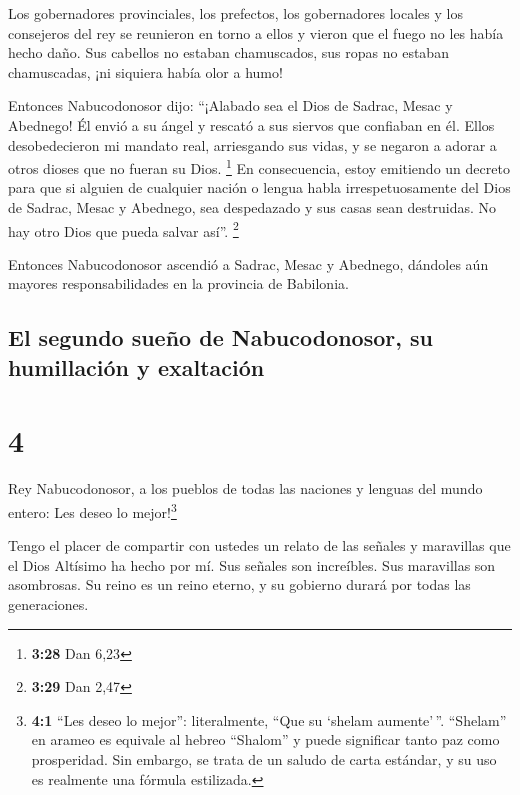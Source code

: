  Los gobernadores provinciales, los prefectos, los
gobernadores locales y los consejeros del rey se reunieron en torno a
ellos y vieron que el fuego no les había hecho daño. Sus cabellos no
estaban chamuscados, sus ropas no estaban chamuscadas, ¡ni siquiera
había olor a humo!

 Entonces Nabucodonosor dijo: ``¡Alabado sea el Dios de
Sadrac, Mesac y Abednego! Él envió a su ángel y rescató a sus siervos
que confiaban en él. Ellos desobedecieron mi mandato real, arriesgando
sus vidas, y se negaron a adorar a otros dioses que no fueran su Dios.
\footnote{\textbf{3:28} Dan 6,23}  En consecuencia, estoy
emitiendo un decreto para que si alguien de cualquier nación o lengua
habla irrespetuosamente del Dios de Sadrac, Mesac y Abednego, sea
despedazado y sus casas sean destruidas. No hay otro Dios que pueda
salvar así''. \footnote{\textbf{3:29} Dan 2,47}

 Entonces Nabucodonosor ascendió a Sadrac, Mesac y
Abednego, dándoles aún mayores responsabilidades en la provincia de
Babilonia.

\hypertarget{el-segundo-sueuxf1o-de-nabucodonosor-su-humillaciuxf3n-y-exaltaciuxf3n}{%
\subsection{El segundo sueño de Nabucodonosor, su humillación y
exaltación}\label{el-segundo-sueuxf1o-de-nabucodonosor-su-humillaciuxf3n-y-exaltaciuxf3n}}

\hypertarget{section-3}{%
\section{4}\label{section-3}}

 Rey Nabucodonosor, a los pueblos de todas las naciones y
lenguas del mundo entero: Les deseo lo mejor!\footnote{\textbf{4:1}
  ``Les deseo lo mejor'': literalmente, ``Que su `shelam aumente'\,''.
  ``Shelam'' en arameo es equivale al hebreo ``Shalom'' y puede
  significar tanto paz como prosperidad. Sin embargo, se trata de un
  saludo de carta estándar, y su uso es realmente una fórmula
  estilizada.}

 Tengo el placer de compartir con ustedes un relato de las
señales y maravillas que el Dios Altísimo ha hecho por mí.
 Sus señales son increíbles. Sus maravillas son
asombrosas. Su reino es un reino eterno, y su gobierno durará por todas
las generaciones.

